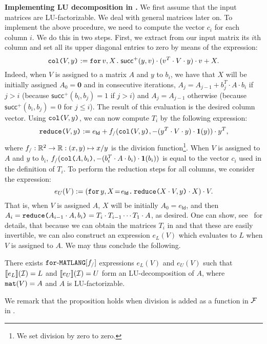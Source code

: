 \smallskip
\noindent
\textbf{Implementing LU decomposition in \langfor.} 
We first assume that the input matrices are LU-factorizable. We deal with general matrices later on.
To implement the above procedure, we need to compute the vector $c_i$ for each column $i$. We do this in two steps. First, we extract from our input matrix its $i$th column and set all its upper diagonal entries to zero
by means of 
 the 
 expression:
$$\ccol{V}{y} := \ffor{v}{X}{\mathsf{succ}^+(y,v)\cdot(v^T\cdot V \cdot y)\cdot v + X}.$$
Indeed, when $V$ is assigned to a matrix $A$ and $y$ to $b_i$, we have that $X$ will be initially assigned
$A_0=\mathbf{0}$ and in consecutive iterations,  $A_j=A_{j-1}+ b_j^T\cdot A\cdot b_i$ if $j>i$ (because $\mathsf{succ}^+(b_i,b_j)=1$ if $j>i$) and $A_j=A_{j-1}$ otherwise (because $\mathsf{succ}^+(b_i,b_j)=0$ for $j\leq i$). The result of this evaluation is the desired column vector.
Using $\ccol{V}{y}$, we can now compute $T_i$ by the following expression:
$$\red{V}{y} := e_{\mathsf{Id}}+ f_/(\ccol{V}{y},-(y^T\cdot V\cdot y)\cdot \ones(y))\cdot y^T,$$
where $f_/:\RR^2\to\RR:(x,y)\mapsto x/y$ is the division function\footnote{We set division by zero to zero.}. 
When $V$ is assigned to $A$ and $y$ to $b_i$, $f_/(\ccol{A}{b_i},-(b_i^T\cdot A\cdot b_i)\cdot \ones(b_i))$ is equal to the vector $c_i$ used in the definition of $T_i$. To perform the reduction steps for all columns, we consider
the expression:
$$
e_{U}(V) :=  \left( \initf{e_{\mathsf{Id}}}{y}{X}{\red{X\cdot V}{y}\cdot X} \right) \cdot V.
$$
That is, when $V$ is assigned $A$, $X$ will be initially $A_0=e_{\mathsf{Id}}$, and then
$A_i=\red{A_{i-1}\cdot A}{b_i}=T_i\cdot T_{i-1}\cdots T_1\cdot A$, as desired.
One can show, see~\cite{geerts2020expressive} for details, that because we can obtain the matrices $T_i$ in \langfor and that these
are easily invertible, we can also construct an expression $e_L(V)$ which evaluates to $L$ when $V$ is assigned to
$A$. We may thus conclude the following.
\begin{proposition}\label{prop:gauss}
There exists $\langforf{f_/}$ expressions $e_L(V)$ and $e_U(V)$ such that
$\sem{e_L}{\I}=L$ and $\sem{e_U}{\I}=U$ form an LU-decomposition of $A$,
where $\conc(V)=A$ and $A$ is LU-factorizable.
\end{proposition}



We remark that the proposition holds when division is added as a function in $\Fun$
in \langfor.

\smallskip

